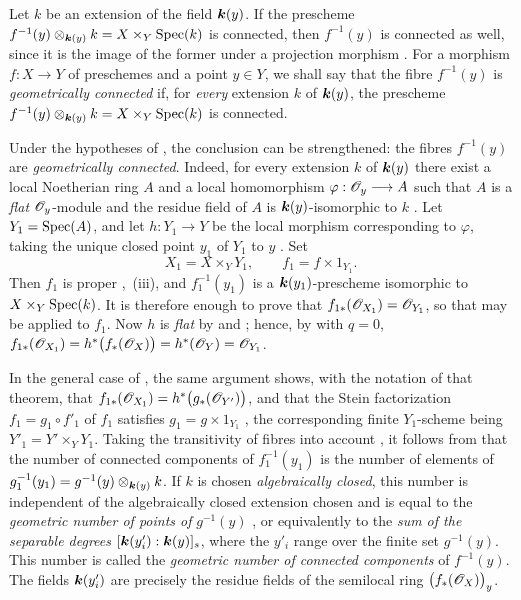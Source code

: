 \begin{remark}[4.3.4]
\label{III.4.3.4}
Let $k$ be an extension of the field $\boldsymbol{k}(y)$.  If the prescheme $f^{-1}(y)\otimes_{\boldsymbol{k}(y)}k
=
X\times_Y\operatorname{Spec}(k)$
is connected, then $f^{-1}(y)$ is connected as well, since it is the
image of the former under a projection morphism
.  For a morphism $f:X\to Y$ of preschemes and a
point $y\in Y$, we shall say that the fibre $f^{-1}(y)$ is
\emph{geometrically connected} if, for \emph{every} extension $k$ of
$\boldsymbol{k}(y)$, the prescheme
$f^{-1}(y)\otimes_{\boldsymbol{k}(y)}k=X\times_Y\operatorname{Spec}(k)$ is connected.


Under the hypotheses of , the conclusion can be
strengthened: the fibres $f^{-1}(y)$ are \emph{geometrically connected}.
Indeed, for every extension $k$ of $\boldsymbol{k}(y)$ there exist a local
Noetherian ring $A$ and a local homomorphism $\varphi:\mathscr{O}_y\longrightarrow A$
such that $A$ is a \emph{flat} $\mathscr{O}_y$-module and the residue field of
$A$ is $\boldsymbol{k}(y)$-isomorphic to $k$ .
Let $Y_1=\operatorname{Spec}(A)$, and let $h:Y_1\to Y$ be the local morphism
corresponding to $\varphi$, taking the unique closed point $y_1$ of
$Y_1$ to $y$ .  Set
\[
  X_1=X\times_Y Y_1,
  \qquad
  f_1=f\times 1_{Y_1}.
\]
Then $f_1$ is proper
,~(iii), and $f_1^{-1}(y_1)$ is a
$\boldsymbol{k}(y_1)$-prescheme isomorphic to $X\times_Y\operatorname{Spec}(k)$.  It is
therefore enough to prove that $f_{1*}(\mathscr{O}_{X_1})=\mathscr{O}_{Y_1}$,
so that  may be applied to $f_1$.  Now $h$ is \emph{flat}
by  and ; hence, by  with $q=0$, $f_{1*}(\mathscr{O}_{X_1})
=
h^*\bigl(f_*(\mathscr{O}_X)\bigr)
=
h^*(\mathscr{O}_Y)
=
\mathscr{O}_{Y_1}$.

In the general case of , the same argument shows,
with the notation of that theorem, that $f_{1*}(\mathscr{O}_{X_1})
=
h^*\bigl(g_*(\mathscr{O}_{Y'})\bigr)$,
and that the Stein factorization $f_1=g_1\circ f'_1$ of $f_1$
satisfies $g_1=g\times 1_{Y_1}$
, the corresponding finite $Y_1$-scheme being
$Y'_1=Y'\times_Y Y_1$.  Taking the transitivity of fibres into
account , it follows from
 that the number of connected components of
$f_1^{-1}(y_1)$ is the number of elements of $g_1^{-1}(y_1)
=
g^{-1}(y)\otimes_{\boldsymbol{k}(y)}k$.
If $k$ is chosen \emph{algebraically closed}, this number is independent of
the algebraically closed extension chosen and is equal to the
\emph{geometric number of points of} $g^{-1}(y)$
, or equivalently to the \emph{sum of the separable degrees} $[\boldsymbol{k}(y'_i):\boldsymbol{k}(y)]_s$,
where the $y'_i$ range over the finite set $g^{-1}(y)$.  This number
is called the \emph{geometric number of connected components} of
$f^{-1}(y)$.  The fields $\boldsymbol{k}(y'_i)$ are precisely the residue
fields of the semilocal ring $\bigl(f_*(\mathscr{O}_X)\bigr)_y$.
\end{remark}

